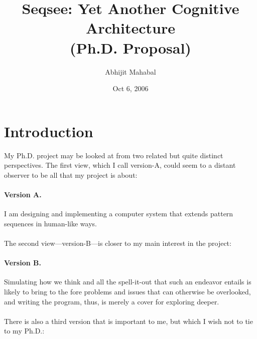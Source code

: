 \documentclass[letterpaper]{article}
\begin{document}
\title{Seqsee: Yet Another Cognitive Architecture\\{(Ph.D. Proposal)}}
\author{Abhijit Mahabal}
\date{Oct 6, 2006}
\maketitle

\renewcommand{\baselinestretch}{1.5}\small

\section*{Introduction}
\label{sec:intro}

\newcommand{\V}[1]{version-#1\xspace}
\newcommand{\hof}{Hofstadter\xspace}
\newcommand{\dan}{Dan Dennett\xspace}
\newcommand{\andy}{Andy Clark\xspace}
\newcommand{\seq}{Seqsee\xspace}
\newcommand{\tofillout}[1]{[Need to fill gap: #1\index{Gaps!#1}]}


My Ph.D. project may be looked at from two related but quite distinct perspectives.  The first view, which I call \V{A}, could seem to a distant observer to be all that my project is about:

\paragraph{Version A.} I am designing and implementing a computer system that extends pattern sequences in human-like ways.

\paragraph{} The second view---\V{B}---is closer to my main interest in the project:

\paragraph{Version B.} Simulating how we think and all the spell-it-out that such an endeavor entails is likely to bring to the fore problems and issues that can otherwise be overlooked, and writing the program, thus, is merely a cover for  exploring deeper.

\paragraph{} There is also a third version that is important to me, but which I wish not to tie to my Ph.D.:
\end{document}
